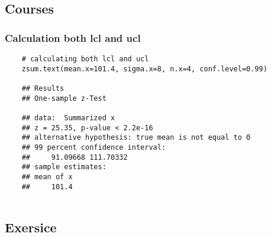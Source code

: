 \subsection{Courses}

\subsubsection{Calculation both lcl and ucl}
\lstset{language=R}
\begin{lstlisting}
    # calculating both lcl and ucl
    zsum.text(mean.x=101.4, sigma.x=8, n.x=4, conf.level=0.99)

    ## Results
    ## One-sample z-Test

    ## data:  Summarized x
    ## z = 25.35, p-value < 2.2e-16
    ## alternative hypothesis: true mean is not equal to 0
    ## 99 percent confidence interval:
    ##     91.09668 111.70332
    ## sample estimates:
    ## mean of x 
    ##     101.4 
    
\end{lstlisting}

\subsection{Exersice}

